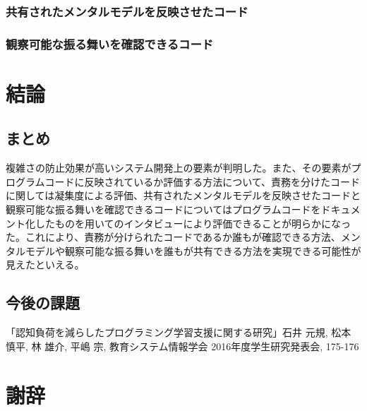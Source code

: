 \documentclass[11pt, a4paper]{jreport}
\begin{document}
\subsection{共有されたメンタルモデルを反映させたコード}
\subsection{観察可能な振る舞いを確認できるコード}
\chapter{結論}
\section{まとめ}
複雑さの防止効果が高いシステム開発上の要素が判明した。また、その要素がプログラムコードに反映されているか評価する方法について、責務を分けたコードに関しては凝集度による評価、共有されたメンタルモデルを反映させたコードと観察可能な振る舞いを確認できるコードについてはプログラムコードをドキュメント化したものを用いてのインタビューにより評価できることが明らかになった。これにより、責務が分けられたコードであるか誰もが確認できる方法、メンタルモデルや観察可能な振る舞いを誰もが共有できる方法を実現できる可能性が見えたといえる。
\section{今後の課題}
\renewcommand{\bibname}{参考文献}
\begin{thebibliography}{10}
「認知負荷を減らしたプログラミング学習支援に関する研究」石井 元規, 松本 慎平, 林 雄介, 平嶋 宗, 教育システム情報学会 2016年度学生研究発表会, 175-176
\end{thebibliography}

\chapter*{謝辞}
\end{document}
